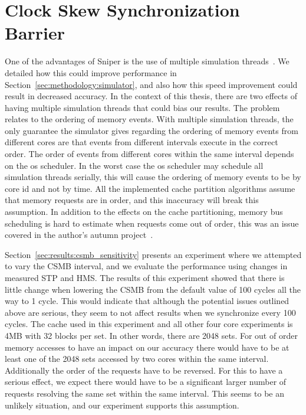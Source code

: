 \section{Clock Skew Synchronization Barrier}

One of the advantages of Sniper is the use of multiple simulation threads~\cite{Carlson2011a}.
We detailed how this could improve performance in Section~\ref{sec:methodology:simulator}, and also how this speed improvement could result in decreased accuracy.
In the context of this thesis, there are two effects of having multiple
simulation threads that could bias our results.
The problem relates to the ordering of memory events.
With multiple simulation threads, the only guarantee the simulator gives regarding the ordering of memory events from different cores are that events from different intervals execute in the correct order.
The order of events from different cores within the same interval depends on the os scheduler.
In the worst case the os scheduler may schedule all simulation threads serially, this will cause the ordering of memory events to be by core id and not by time.
All the implemented cache partition algorithms assume that memory requests are in order, and this inaccuracy will break this assumption.
In addition to the effects on the cache partitioning, memory bus scheduling is hard to estimate when requests come out of order, this was an issue covered in the author's autumn project~\cite{Olsen2014}.

Section~\ref{sec:results:csmb_sensitivity} presents an experiment where we attempted to vary the CSMB interval, and we evaluate the performance using changes in measured STP and HMS.
The results of this experiment showed that there is little change when lowering the CSMB from the default value of 100 cycles all the way to 1 cycle.
This would indicate that although the potential issues outlined above are serious, they seem to not affect results when we synchronize every 100 cycles.
The cache used in this experiment and all other four core experiments is 4MB with 32 blocks per set.
In other words, there are 2048 sets.
For out of order memory accesses to have an impact on our accuracy there would have to be at least one of the 2048 sets accessed by two cores within the same interval.
Additionally the order of the requests have to be reversed.
For this to have a serious effect, we expect there would have to be a significant larger number of requests resolving the same set within the same interval.
This seems to be an unlikely situation, and our experiment supports this assumption.

